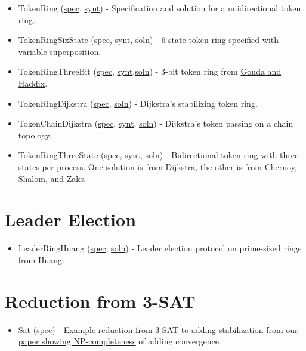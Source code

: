 \begin{itemize}
\item TokenRing (\href{examplespec/TokenRing.prot}{spec}, \href{examplesynt/TokenRing.prot}{synt})
- Specification and solution for a unidirectional token ring.
\item TokenRingSixState (\href{examplespec/TokenRingSuperpos.prot}{spec}, \href{examplesynt/TokenRingSuperpos.prot}{synt}, \href{examplesoln/TokenRingSixState.prot}{soln})
- 6-state token ring specified with variable superposition.
\item TokenRingThreeBit (\href{examplespec/TokenRingThreeBit.prot}{spec}, \href{examplesynt/TokenRingThreeBit.prot}{synt},\href{examplesoln/TokenRingThreeBit.prot}{soln})
- 3-bit token ring from \href{http://dx.doi.org/10.1006/jpdc.1996.0066}{Gouda and Haddix}.
\item TokenRingDijkstra (\href{examplespec/TokenRingDijkstra.prot}{spec}, \href{examplesoln/TokenRingDijkstra.prot}{soln})
- Dijkstra's stabilizing token ring.
\item TokenChainDijkstra (\href{examplespec/TokenChainDijkstra.prot}{spec}, \href{examplesynt/TokenChainDijkstra.prot}{synt}, \href{examplesoln/TokenChainDijkstra.prot}{soln})
- Dijkstra's token passing on a chain topology.
\item TokenRingThreeState (\href{examplespec/TokenRingThreeState.prot}{spec}, \href{examplesynt/TokenRingThreeState.prot}{synt}, \href{examplesoln/TokenRingThreeState.prot}{soln})
- Bidirectional token ring with three states per process.
One solution is from Dijkstra, the other is from \href{http://citeseerx.ist.psu.edu/viewdoc/summary?doi=10.1.1.153.6017}{Chernoy, Shalom, and Zaks}.
\end{itemize}

\section{Leader Election}

\begin{itemize}
\item LeaderRingHuang (\href{examplespec/LeaderRingHuang.prot}{spec}, \href{examplesoln/LeaderRingHuang.prot}{soln})
- Leader election protocol on prime-sized rings from \href{http://dx.doi.org/10.1145/169683.174161}{Huang}.
\end{itemize}

\section{Reduction from 3-SAT}

\begin{itemize}
\item Sat (\href{examplespec/Sat.prot}{spec})
- Example reduction from 3-SAT to adding stabilization from our \href{http://dx.doi.org/10.1007/978-3-642-40213-5_2}{paper showing NP-completeness} of adding convergence.
\end{itemize}



